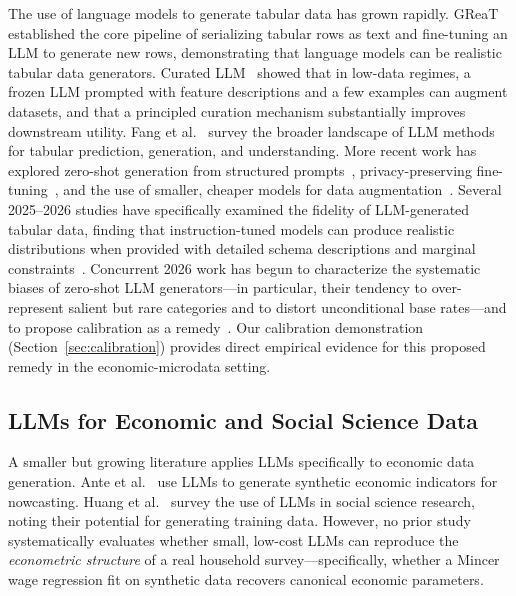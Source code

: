 \documentclass[11pt]{article}
\begin{document}
The use of language models to generate tabular data has grown rapidly.
GReaT~\cite{borisov2023great} established the core pipeline of serializing tabular rows as text and fine-tuning an LLM to generate new rows, demonstrating that language models can be realistic tabular data generators.
Curated LLM~\cite{seedat2024curatedllm} showed that in low-data regimes, a frozen LLM prompted with feature descriptions and a few examples can augment datasets, and that a principled curation mechanism substantially improves downstream utility.
Fang et al.~\cite{fang2024llmtabular} survey the broader landscape of LLM methods for tabular prediction, generation, and understanding.
More recent work has explored zero-shot generation from structured prompts~\cite{braun2025synthetic}, privacy-preserving fine-tuning~\cite{chen2025privsynth}, and the use of smaller, cheaper models for data augmentation~\cite{lee2025smallllm}.
Several 2025--2026 studies have specifically examined the fidelity of LLM-generated tabular data, finding that instruction-tuned models can produce realistic distributions when provided with detailed schema descriptions and marginal constraints~\cite{mousavi2025llmtable,gupta2025syntheticllm}.
Concurrent 2026 work has begun to characterize the systematic biases of zero-shot LLM generators---in particular, their tendency to over-represent salient but rare categories and to distort unconditional base rates---and to propose calibration as a remedy~\cite{zhang2026llmcalib,liu2026syntheticbias}.
Our calibration demonstration (Section~\ref{sec:calibration}) provides direct empirical evidence for this proposed remedy in the economic-microdata setting.

\subsection{LLMs for Economic and Social Science Data}

A smaller but growing literature applies LLMs specifically to economic data generation.
Ante et al.~\cite{ante2025llmeconomics} use LLMs to generate synthetic economic indicators for nowcasting.
Huang et al.~\cite{huang2025llmsurvey} survey the use of LLMs in social science research, noting their potential for generating training data.
However, no prior study systematically evaluates whether small, low-cost LLMs can reproduce the \emph{econometric structure} of a real household survey---specifically, whether a Mincer wage regression fit on synthetic data recovers canonical economic parameters.
\end{document}
